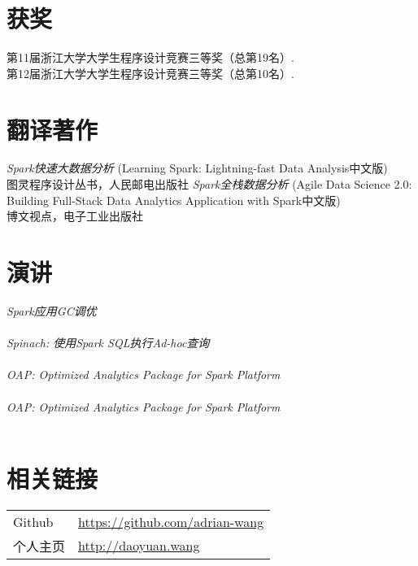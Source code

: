 \documentclass[line,margin]{res}
\begin{document}
\begin{resume}
\section{获奖}
            第11届浙江大学大学生程序设计竞赛三等奖（总第19名）.\\
            第12届浙江大学大学生程序设计竞赛三等奖（总第10名）.

\section{翻译著作}
            {\sl Spark快速大数据分析} (Learning Spark: Lightning-fast Data Analysis中文版) \\
            \hfill 图灵程序设计丛书，人民邮电出版社
            {\sl Spark全栈数据分析} (Agile Data Science 2.0: Building Full-Stack Data Analytics Application with Spark中文版) \\
            \hfill 博文视点，电子工业出版社

\section{演讲}
            {\sl Spark应用GC调优}\\
                \\
            {\sl Spinach: 使用Spark SQL执行Ad-hoc查询}\\
                \\
            {\sl OAP: Optimized Analytics Package for Spark Platform}\\
                \\
            {\sl OAP: Optimized Analytics Package for Spark Platform}\\
                \\

\section{相关链接}
            \begin{tabular}{p{}p{}}
            {Github} &\href{https://github.com/adrian-wang}{https://github.com/adrian-wang}\\
            {个人主页} &\href{http://daoyuan.wang}{http://daoyuan.wang}\\
            \end{tabular}
\end{resume}
\end{document}
